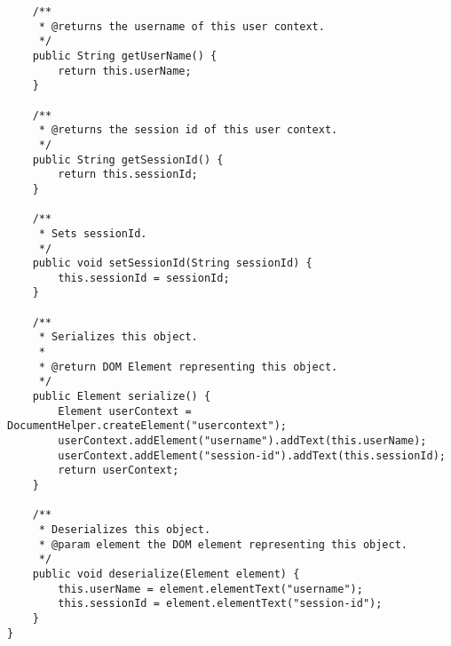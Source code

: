 \begin{verbatim}
    /**
     * @returns the username of this user context.  
     */
    public String getUserName() {
        return this.userName;
    }

    /**
     * @returns the session id of this user context.
     */
    public String getSessionId() {
        return this.sessionId;
    }

	/**
	 * Sets sessionId.
	 */
	public void setSessionId(String sessionId) {
		this.sessionId = sessionId;
	}
	
	/**
	 * Serializes this object.
	 * 
	 * @return DOM Element representing this object.
	 */
	public Element serialize() {
		Element userContext = DocumentHelper.createElement("usercontext");
		userContext.addElement("username").addText(this.userName);
		userContext.addElement("session-id").addText(this.sessionId);
		return userContext;
	}
	
	/**
	 * Deserializes this object.
	 * @param element the DOM element representing this object.
	 */
	public void deserialize(Element element) {
		this.userName = element.elementText("username");
		this.sessionId = element.elementText("session-id");
	}
}
\end{verbatim}
